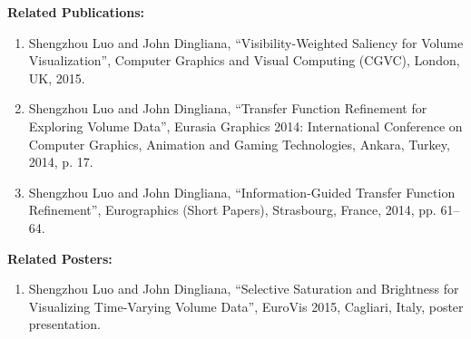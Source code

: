 \documentclass[a4paper, 12pt, oneside]{report}         %
\begin{document}
\begin{thesisabstract}
\newpage

\textbf{Related Publications:}
\begin{enumerate}
	\item Shengzhou Luo and John Dingliana, ``Visibility-Weighted Saliency for Volume Visualization'', Computer Graphics and Visual Computing (CGVC), London, UK, 2015.
	\item Shengzhou Luo and John Dingliana, ``Transfer Function Refinement for Exploring Volume Data'', Eurasia Graphics 2014: International Conference on Computer Graphics, Animation and Gaming Technologies, Ankara, Turkey, 2014, p. 17.
	\item Shengzhou Luo and John Dingliana, ``Information-Guided Transfer Function Refinement'', Eurographics (Short Papers), Strasbourg, France, 2014, pp. 61--64.
\end{enumerate}

\textbf{Related Posters:}
\begin{enumerate}
	\item Shengzhou Luo and John Dingliana, ``Selective Saturation and Brightness for Visualizing Time-Varying Volume Data'', EuroVis 2015, Cagliari, Italy, poster presentation.
\end{enumerate}

\end{thesisabstract}

\tableofcontents                                  %
\listoftables                                     %
\listoffigures                                    %

                                
                                





%

\begin{appendix}
 
 
\end{appendix}






\end{document}
